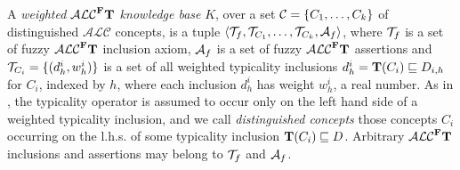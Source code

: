 \documentclass[runningheads]{llncs}
\newcommand{\tip}{{\bf T}}
\newcommand{\alc}{\mathcal{ALC}}
\newcommand{\alcFt}{\mathcal{ALC}^{\Fe}\tip}
\newcommand {\Fe} {{\bf F}}
\begin{document}
A  {\em weighted $\alcFt$ knowledge base} $K$, over a set ${\cal C}= \{C_1, \ldots, C_k\}$ of distinguished $\alc$ concepts,
is a tuple $\langle  {\cal T}_{f}, {\cal T}_{C_1}, \ldots, {\cal T}_{C_k}, {\cal A}_f  \rangle$, where  ${\cal T}_{f}$  is a set of fuzzy $\alcFt$ inclusion axiom, ${\cal A}_f$ is a set of fuzzy $\alcFt$ assertions  
and
${\cal T}_{C_i}=\{(d^i_h,w^i_h)\}$ is a set of all weighted typicality inclusions $d^i_h= \tip(C_i) \sqsubseteq D_{i,h}$ for $C_i$, indexed by $h$, where each inclusion $d^i_h$ has weight $w^i_h$, a real number.
As in \cite{JELIA2021}, the typicality operator is assumed to occur only on the left hand side of a weighted typicality inclusion, and we call {\em distinguished concepts}  those concepts $C_i$ occurring on the l.h.s. of some typicality inclusion $\tip(C_i) \sqsubseteq D$.
Arbitrary $\alcFt$ inclusions and assertions may belong to ${\cal T}_{f}$ and ${\cal A}_{f}$. 
\end{document}
